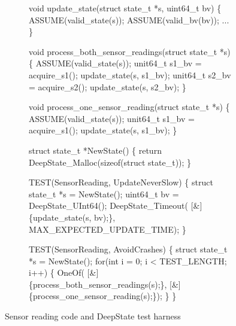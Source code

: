 \begin{figure}[t]
  \begin{subfigure}{0.5\columnwidth}
  {\scriptsize
  \begin{code}

void update\_state(struct state\_t *s, uint64\_t bv) \{
  ASSUME(valid\_state(s));
  ASSUME(valid\_bv(bv));
  ...
\}

void process\_both\_sensor\_readings(struct state\_t *s) \{
  ASSUME(valid\_state(s)); 
  unit64\_t s1\_bv = acquire\_s1(); 
  update\_state(s, s1\_bv); 
  unit64\_t s2\_bv = acquire\_s2(); 
  update\_state(s, s2\_bv);  
\}
  
void process\_one\_sensor\_reading(struct state\_t *s) \{
  ASSUME(valid\_state(s)); 
  unit64\_t s1\_bv = acquire\_s1(); 
  update\_state(s, s1\_bv); 
\}
\end{code}
}
\end{subfigure}
\begin{subfigure}{0.5\columnwidth}
{\scriptsize
\begin{code}
struct state\_t *NewState() \{
  return
    DeepState\_Malloc(sizeof(struct state\_t));   
\}
    
TEST(SensorReading, UpdateNeverSlow) \{
  struct state\_t *s = NewState();
  uint64\_t bv = DeepState\_UInt64();
  DeepState\_Timeout(
    [\&]\{update\_state(s, bv);\},
    MAX\_EXPECTED\_UPDATE\_TIME);
\}

TEST(SensorReading, AvoidCrashes) \{
  struct state\_t *s = NewState();
  for(int i = 0; i < TEST\_LENGTH; i++) \{
    OneOf(
        [\&]\{process\_both\_sensor\_readings(s);\},
        [\&]\{process\_one\_sensor\_reading(s);\});
  \}
\} 
\end{code}
}
\end{subfigure}
  \caption{Sensor reading code and DeepState test harness}
  \label{fig:assumption}
  \end{figure}

